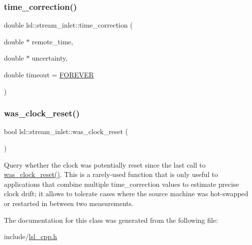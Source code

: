 \subsubsection{\texorpdfstring{time\+\_\+correction()}{time\_correction()}\hspace{0.1cm}{\footnotesize\ttfamily [2/2]}}
{\footnotesize\ttfamily double lsl\+::stream\+\_\+inlet\+::time\+\_\+correction (\begin{DoxyParamCaption}\item[{double $\ast$}]{remote\+\_\+time,  }\item[{double $\ast$}]{uncertainty,  }\item[{double}]{timeout = {\ttfamily \hyperlink{namespacelsl_a74cfbc9077aca21295117217249721ed}{F\+O\+R\+E\+V\+ER}} }\end{DoxyParamCaption})\hspace{0.3cm}{\ttfamily [inline]}}

\mbox{\label{classlsl_1_1stream__inlet_ac3b8fa8912090ad6607b05cbb5848352}} 
\subsubsection{\texorpdfstring{was\+\_\+clock\+\_\+reset()}{was\_clock\_reset()}}
{\footnotesize\ttfamily bool lsl\+::stream\+\_\+inlet\+::was\+\_\+clock\+\_\+reset (\begin{DoxyParamCaption}{ }\end{DoxyParamCaption})\hspace{0.3cm}{\ttfamily [inline]}}

Query whether the clock was potentially reset since the last call to \hyperlink{classlsl_1_1stream__inlet_ac3b8fa8912090ad6607b05cbb5848352}{was\+\_\+clock\+\_\+reset()}. This is a rarely-\/used function that is only useful to applications that combine multiple time\+\_\+correction values to estimate precise clock drift; it allows to tolerate cases where the source machine was hot-\/swapped or restarted in between two measurements. 

The documentation for this class was generated from the following file\+:\begin{DoxyCompactItemize}
\item 
include/\hyperlink{lsl__cpp_8h}{lsl\+\_\+cpp.\+h}\end{DoxyCompactItemize}
